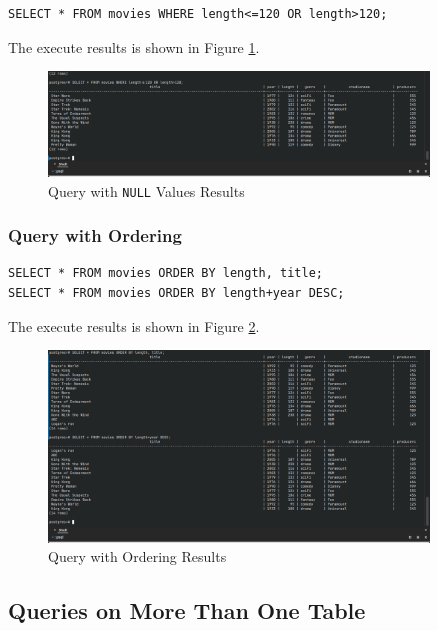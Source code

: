 \documentclass{cshwk}
\begin{document}
\begin{lstlisting}
SELECT * FROM movies WHERE length<=120 OR length>120;
\end{lstlisting}

The execute results is shown in Figure \ref{fig:null-values-3}.
\begin{figure}[htbp]
    \centering
    \includegraphics[width=0.9\textwidth]{hw4-7.png}
    \caption{Query with \texttt{NULL} Values Results}
    \label{fig:null-values-3}
\end{figure}


\subsubsection{Query with Ordering}

\begin{lstlisting}
SELECT * FROM movies ORDER BY length, title;
SELECT * FROM movies ORDER BY length+year DESC;
\end{lstlisting}

The execute results is shown in Figure \ref{fig:ordering}.
\begin{figure}[htbp]
    \centering
    \includegraphics[width=0.9\textwidth]{hw4-8.png}
    \caption{Query with Ordering Results}
    \label{fig:ordering}
\end{figure}

\subsection{Queries on More Than One Table}
\end{document}
